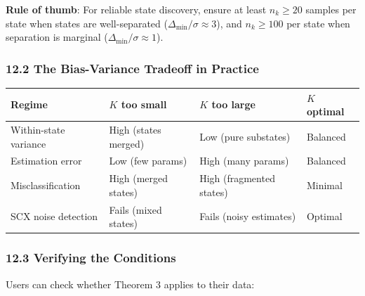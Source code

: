 \documentclass[
  12pt,
]{article}
\begin{document}
\textbf{Rule of thumb}: For reliable state discovery, ensure at least
\(n_k \geq 20\) samples per state when states are well-separated
(\(\Delta_{\min} / \sigma \approx 3\)), and \(n_k \geq 100\) per state
when separation is marginal (\(\Delta_{\min} / \sigma \approx 1\)).

\subsubsection{12.2 The Bias-Variance Tradeoff in
Practice}\label{the-bias-variance-tradeoff-in-practice}

\begin{longtable}[]{@{}
  >{\raggedright\arraybackslash}p{}
  >{\raggedright\arraybackslash}p{}
  >{\raggedright\arraybackslash}p{}
  >{\raggedright\arraybackslash}p{}@{}}
\toprule\noalign{}
\begin{minipage}[b]{\linewidth}\raggedright
Regime
\end{minipage} & \begin{minipage}[b]{\linewidth}\raggedright
\(K\) too small
\end{minipage} & \begin{minipage}[b]{\linewidth}\raggedright
\(K\) too large
\end{minipage} & \begin{minipage}[b]{\linewidth}\raggedright
\(K\) optimal
\end{minipage} \\
\midrule\noalign{}
\endhead
\bottomrule\noalign{}
\endlastfoot
Within-state variance & High (states merged) & Low (pure substates) &
Balanced \\
Estimation error & Low (few params) & High (many params) & Balanced \\
Misclassification & High (merged states) & High (fragmented states) &
Minimal \\
SCX noise detection & Fails (mixed states) & Fails (noisy estimates) &
Optimal \\
\end{longtable}

\subsubsection{12.3 Verifying the
Conditions}\label{verifying-the-conditions}

Users can check whether Theorem 3 applies to their data:
\end{document}
